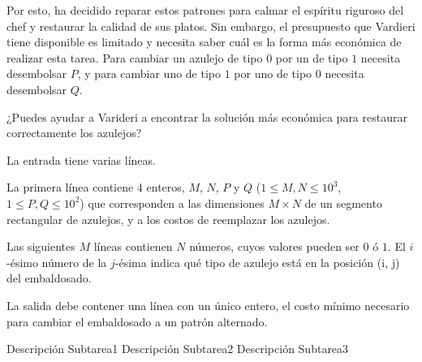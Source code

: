 \documentclass{oci}
\begin{document}
\begin{problemDescription}
Por esto, ha decidido reparar estos patrones para calmar el espíritu riguroso del chef y restaurar la calidad de sus platos.
Sin embargo, el presupuesto que Vardieri tiene disponible es limitado y necesita saber cuál es la forma más económica de realizar esta tarea.
Para cambiar un azulejo de tipo $0$ por un de tipo $1$ necesita desembolsar $P$, y para cambiar uno de tipo $1$ por uno de tipo $0$ necesita desembolsar $Q$.

¿Puedes ayudar a Varideri a encontrar la solución más económica para restaurar correctamente los azulejos?

\end{problemDescription}

\begin{inputDescription}
La entrada tiene varias líneas.

La primera línea contiene 4 enteros, $M$, $N$, $P$ y $Q$ ($1 \le M, N \le 10^3$, $1 \le P, Q \le 10^2$) que corresponden a las dimensiones $M \times N$ de un segmento rectangular de azulejos, y a los costos de reemplazar los azulejos.

Las siguientes $M$ líneas contienen $N$ números, cuyos valores pueden ser $0$ ó $1$.
El $i$-ésimo número de la $j$-ésima indica qué tipo de azulejo está en la posición (i, j) del embaldosado.
\end{inputDescription}

\begin{outputDescription}
La salida debe contener una línea con un único entero, el costo mínimo necesario para cambiar el embaldosado a un patrón alternado.
\end{outputDescription}

\begin{scoreDescription}
  Descripción Subtarea1
  Descripción Subtarea2
  Descripción Subtarea3
\end{scoreDescription}

\begin{sampleDescription}
\end{sampleDescription}
\end{document}
